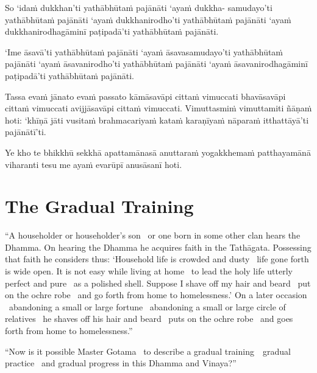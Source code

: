 So ‘idaṁ dukkhan’ti yathābhūtaṁ pajānāti ‘ayaṁ dukkha- samudayo’ti yathābhūtaṁ pajānāti ‘ayaṁ dukkhanirodho’ti yathābhūtaṁ pajānāti ‘ayaṁ dukkhanirodhagāminī paṭipadā’ti yathābhūtaṁ pajānāti.

‘Ime āsavā’ti yathābhūtaṁ pajānāti ‘ayaṁ āsavasamudayo’ti yathābhūtaṁ pajānāti ‘ayaṁ āsavanirodho’ti yathābhūtaṁ pajānāti ‘ayaṁ āsavanirodhagāminī paṭipadā’ti yathābhūtaṁ pajānāti.

Tassa evaṁ jānato evaṁ passato kāmāsavāpi cittaṁ vimuccati bhavāsavāpi cittaṁ vimuccati avijjāsavāpi cittaṁ vimuccati. Vimuttasmiṁ vimuttamiti ñāṇaṁ hoti: ‘khīṇā jāti vusitaṁ brahmacariyaṁ kataṁ karaṇīyaṁ nāparaṁ itthattāyā’ti pajānātī’ti.

\suttaRef{[MN 39]}

Ye kho te bhikkhū sekkhā apattamānasā anuttaraṁ yogakkhemaṁ patthayamānā viharanti tesu me ayaṁ evarūpī anusāsanī hoti.

\suttaRef{[MN 107]}

\section{The Gradual Training}
\label{gradual-training}

\begin{leader}
\end{leader}
\begin{justify}
  “A householder or householder’s son \breathmark\ or one born in some other clan hears the Dhamma. On hearing the Dhamma he acquires faith in the Tathāgata. Possessing that faith he considers thus: ‘Household life is crowded and dusty \breathmark\ life gone forth is wide open. It is not easy while living at home \breathmark\ to lead the holy life utterly perfect and pure \breathmark\ as a polished shell. Suppose I shave off my hair and beard \breathmark\ put on the ochre robe \breathmark\ and go forth from home to homelessness.’ On a later occasion \breathmark\ abandoning a small or large fortune \breathmark\ abandoning a small or large circle of relatives \breathmark\ he shaves off his hair and beard \breathmark\ puts on the ochre robe \breathmark\ and goes forth from home to homelessness.”
\end{justify}

\suttaRef{[MN 27 / 38 / 51]}

\begin{justify}
  “Now is it possible Master Gotama \breathmark\ to describe a gradual \mbox{training}~\breathmark\ gradual practice \breathmark\ and gradual progress in this Dhamma and Vinaya?”
\end{justify}

